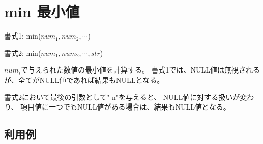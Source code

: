
%

\section{min 最小値\label{sect:min}}

書式1: min($num_1,num_2,\cdots$)

書式2: min($num_1,num_2,\cdots,str$)

$num_i$で与えられた数値の最小値を計算する。
書式1では、NULL値は無視されるが、全てがNULL値であれば結果もNULLとなる。

書式2において最後の引数として"-n"を与えると、
NULL値に対する扱いが変わり、
項目値に一つでもNULL値がある場合は、結果もNULL値となる。

\subsection*{利用例}


%

